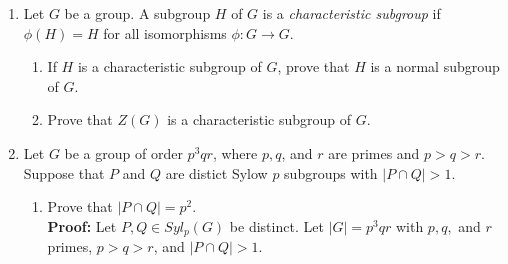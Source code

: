 \documentclass{article}
\begin{document}
\begin{enumerate}
\begin{enumerate}
        Now, assume that $|G| = p^{k}, k < \alpha \Longrightarrow \exists H \leq G$ with $|H| = p^{k-1}$ is true. We need to show that $|G| = 
        p^{k+1} \Longrightarrow \exists H \leq G$ with $|H| = p^{k}$ is true. Then assume that $|G| = p^{\alpha}$. Note that, by our proof in 
        part $(a)$ above, $p \big| |Z(G)|$. Then, by Cauchy's Theorem for abelian groups, $\exists N \leq Z(G)$ such that $|N| = p$. Further, 
        since $N \leq Z(G)$, $N \trianglelefteq G$ (any subgroup of the center of a group must be a normal subgroup of the entire group).

        Next, consider the quotient group $\sfrac{G}{N}$. Note that, since $G$ and $N$ are finite, 
        \[
            \big| \sfrac{G}{N} \big| = \sfrac{|G|}{|N|} = \dfrac{p^{\alpha}}{p} = p^{\alpha-1}.
        \]
        Then, by our inductive hypothesis, $\exists K \leq \sfrac{G}{N}$ such that $|K| = p^{\alpha-2}$. Then, by the Fourth Isomorphism 
        Theorem, $\exists H \leq G$ such that $N \subseteq H$ and $\sfrac{H}{N} \cong K$. Then we have
        \begin{align*}
             |H| &= \big| \sfrac{H}{N} \big| \cdot |N| \\
             &= |K| \cdot |N| \\
             &= p^{\alpha-2} \cdot p \\
             &= p^{\alpha -1} \\
             &\Longrightarrow \exists H \leq G: |H| = p^{\alpha - 1}. \ \square
        \end{align*}
    \end{enumerate}
    \item Let $G$ be a group. A subgroup $H$ of $G$ is a \textit{characteristic subgroup} if $\phi(H)=H$ for all isomorphisms $\phi:G 
    \longrightarrow G$.
    \begin{enumerate}
        \item If $H$ is a characteristic subgroup of $G$, prove that $H$ is a normal subgroup of $G$.
        \item Prove that $Z(G)$ is a characteristic subgroup of $G$.
    \end{enumerate}
    \item Let $G$ be a group of order $p^3qr$, where $p,q$, and $r$ are primes and $p>q>r$. Suppose that $P$ and $Q$ are distict Sylow $p$ 
    subgroups with $|P \cap Q| > 1$.
    \begin{enumerate}
        \item Prove that $|P \cap Q| = p^2$.\\
        \textbf{Proof:} Let $P,Q \in Syl_p(G)$ be distinct. Let $|G| = p^3qr$ with $p,q,$ and $r$ primes, $p>q>r$, and $|P \cap Q| > 1$. 
        

\end{enumerate}
\end{enumerate}
\end{document}
